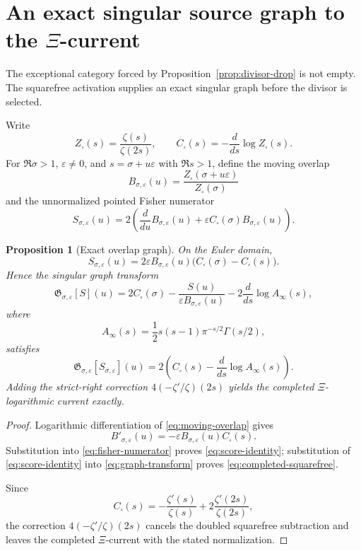 \documentclass[11pt]{article}
\newtheorem{proposition}[theorem]{Proposition}
\theoremstyle{definition}
\theoremstyle{remark}
\begin{document}
\section{An exact singular source graph to the \(\Xi\)-current}\label{sec:singular-graph}

The exceptional category forced by Proposition~\ref{prop:divisor-drop} is not empty.  The
squarefree activation supplies an exact singular graph before the divisor is selected.

Write
\[
 Z_\square(s)=\frac{\zeta(s)}{\zeta(2s)},\qquad
 C_\square(s)=-\frac{d}{ds}\log Z_\square(s).
\tag{9.1}\label{eq:squarefree-current}
\]
For \(\Re\sigma>1\), \(\varepsilon\neq0\), and
\(s=\sigma+u\varepsilon\) with \(\Re s>1\), define the moving overlap
\[
 B_{\sigma,\varepsilon}(u)=
 \frac{Z_\square(\sigma+u\varepsilon)}{Z_\square(\sigma)}
\tag{9.2}\label{eq:moving-overlap}
\]
and the unnormalized pointed Fisher numerator
\[
 S_{\sigma,\varepsilon}(u)=
 2\left(
 \frac{d}{du}B_{\sigma,\varepsilon}(u)
 +
 \varepsilon C_\square(\sigma)B_{\sigma,\varepsilon}(u)
 \right).
\tag{9.3}\label{eq:fisher-numerator}
\]

\begin{proposition}[Exact overlap graph]\label{prop:overlap-graph}
On the Euler domain,
\[
 S_{\sigma,\varepsilon}(u)
 =2\varepsilon B_{\sigma,\varepsilon}(u)
 \bigl(C_\square(\sigma)-C_\square(s)\bigr).
\tag{9.4}\label{eq:score-identity}
\]
Hence the singular graph transform
\[
 \mathfrak G_{\sigma,\varepsilon}[S](u)=
 2C_\square(\sigma)
 -\frac{S(u)}{\varepsilon B_{\sigma,\varepsilon}(u)}
 -2\frac{d}{ds}\log A_\infty(s),
\tag{9.5}\label{eq:graph-transform}
\]
where
\[
 A_\infty(s)=\frac12s(s-1)\pi^{-s/2}\Gamma(s/2),
\]
satisfies
\[
 \mathfrak G_{\sigma,\varepsilon}
 [S_{\sigma,\varepsilon}](u)
 =
 2\left(C_\square(s)-\frac{d}{ds}\log A_\infty(s)\right).
\tag{9.6}\label{eq:completed-squarefree}
\]
Adding the strict-right correction \(4(-\zeta'/\zeta)(2s)\) yields the completed
\(\Xi\)-logarithmic current exactly.
\end{proposition}

\begin{proof}
Logarithmic differentiation of \eqref{eq:moving-overlap} gives
\[
 B'_{\sigma,\varepsilon}(u)
 =-\varepsilon B_{\sigma,\varepsilon}(u)C_\square(s).
\]
Substitution into \eqref{eq:fisher-numerator} proves \eqref{eq:score-identity}; substitution of
\eqref{eq:score-identity} into \eqref{eq:graph-transform} proves
\eqref{eq:completed-squarefree}.

Since
\[
 C_\square(s)
 =-\frac{\zeta'(s)}{\zeta(s)}
 +2\frac{\zeta'(2s)}{\zeta(2s)},
\]
the correction \(4(-\zeta'/\zeta)(2s)\) cancels the doubled squarefree subtraction and leaves
the completed \(\Xi\)-current with the stated normalization.
\end{proof}
\end{document}
